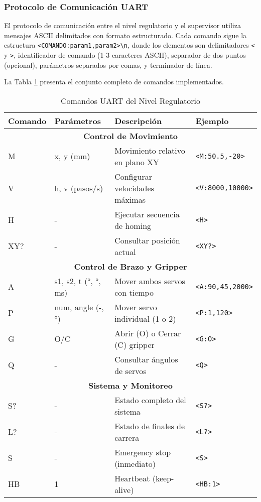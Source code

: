 \subsubsection{Protocolo de Comunicación UART}

El protocolo de comunicación entre el nivel regulatorio y el supervisor utiliza mensajes ASCII delimitados con formato estructurado. Cada comando sigue la estructura \texttt{<COMANDO:param1,param2>\textbackslash n}, donde los elementos son delimitadores \texttt{<} y \texttt{>}, identificador de comando (1-3 caracteres ASCII), separador de dos puntos (opcional), parámetros separados por comas, y terminador de línea.

La Tabla \ref{tab:comandos_uart} presenta el conjunto completo de comandos implementados.

\begin{table}[H]
\centering
\small
\begin{tabular}{|l|l|p{4.5cm}|l|}
\hline
\textbf{Comando} & \textbf{Parámetros} & \textbf{Descripción} & \textbf{Ejemplo} \\
\hline
\multicolumn{4}{|c|}{\textbf{Control de Movimiento}} \\
\hline
M & x, y (mm) & Movimiento relativo en plano XY & \texttt{<M:50.5,-20>} \\
\hline
V & h, v (pasos/s) & Configurar velocidades máximas & \texttt{<V:8000,10000>} \\
\hline
H & - & Ejecutar secuencia de homing & \texttt{<H>} \\
\hline
XY? & - & Consultar posición actual & \texttt{<XY?>} \\
\hline
\multicolumn{4}{|c|}{\textbf{Control de Brazo y Gripper}} \\
\hline
A & s1, s2, t (°, °, ms) & Mover ambos servos con tiempo & \texttt{<A:90,45,2000>} \\
\hline
P & num, angle (-, °) & Mover servo individual (1 o 2) & \texttt{<P:1,120>} \\
\hline
G & O/C & Abrir (O) o Cerrar (C) gripper & \texttt{<G:O>} \\
\hline
Q & - & Consultar ángulos de servos & \texttt{<Q>} \\
\hline
\multicolumn{4}{|c|}{\textbf{Sistema y Monitoreo}} \\
\hline
S? & - & Estado completo del sistema & \texttt{<S?>} \\
\hline
L? & - & Estado de finales de carrera & \texttt{<L?>} \\
\hline
S & - & Emergency stop (inmediato) & \texttt{<S>} \\
\hline
HB & 1 & Heartbeat (keep-alive) & \texttt{<HB:1>} \\
\hline
\end{tabular}
\caption{Comandos UART del Nivel Regulatorio}
\label{tab:comandos_uart}
\end{table}

